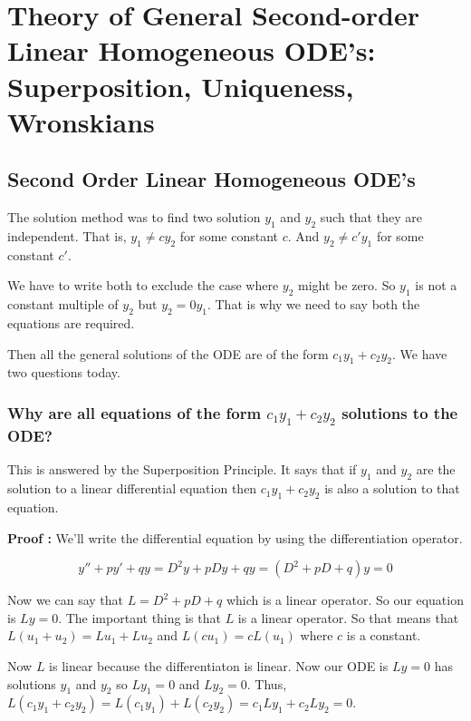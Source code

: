

\chapter{Theory of General Second-order Linear Homogeneous ODE's: Superposition, Uniqueness, Wronskians}

\bigbreak

\section{Second Order Linear Homogeneous ODE's}

The solution method was to find two solution $y_1$ and $y_2$
such that they are independent.
That is, $y_1 \neq c y_2$ for some constant $c$.
And $y_2 \neq c' y_1$ for some constant $c'$.

We have to write both to exclude the case where $y_2$ might be zero. 
So $y_1$ is not a constant multiple of $y_2$ but $y_2 = 0 y_1$.
That is why we need to say both the equations are required.

Then all the general solutions of the ODE are of the form $c_1 y_1 + c_2 y_2$.
We have two questions today.

\subsection{Why are all equations of the form $c_1 y_1 + c_2 y_2$ solutions to the ODE?}

This is answered by the Superposition Principle.
It says that if $y_1$ and $y_2$ are the solution to a linear differential equation
then $c_1 y_1 + c_2 y_2$ is also a solution to that equation.

{\bf Proof : } We'll write the differential equation by using the differentiation operator.

$$ y'' + py' + qy = D^2y + pDy + qy = (D^2 + pD + q)y = 0 $$

Now we can say that $L = D^2 + pD + q$ which is a linear operator.
So our equation is $Ly = 0$.
The important thing is that $L$ is a linear operator.
So that means that $L(u_1 + u_2) = Lu_1 + Lu_2$ and $L(cu_1) = cL(u_1)$ where $c$ is a constant.

Now $L$ is linear because the differentiaton is linear.
Now our ODE is $Ly = 0$ has solutions $y_1$ and $y_2$ so $Ly_1 = 0$ and $Ly_2 = 0$.
Thus, $L(c_1 y_1 + c_2 y_2) = L(c_1 y_1) + L(c_2 y_2) = c_1 L y_1 + c_2 L y_2 = 0$.

